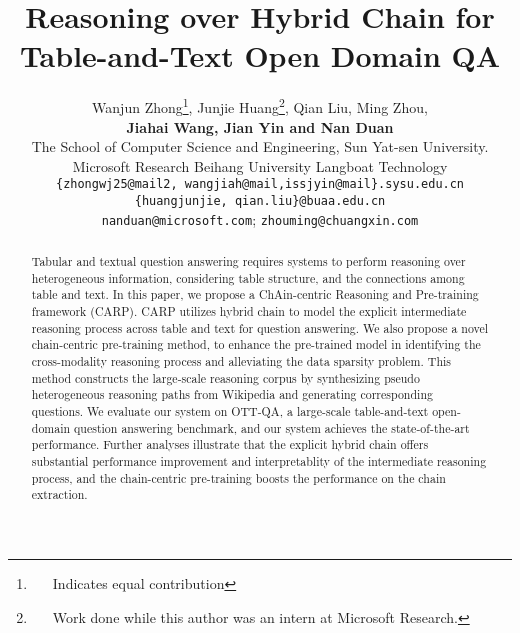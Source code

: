 \documentclass[11pt]{article}
\title{Reasoning over Hybrid Chain for Table-and-Text Open Domain QA}
\author{Wanjun Zhong\thanks{\ \ \ Indicates equal contribution}, Junjie Huang\thanks{\ \ \ Work done while this author was an intern at Microsoft Research.}, Qian Liu, Ming Zhou,\\ \textbf{Jiahai Wang, Jian Yin and Nan Duan} \\
	 The School of Computer Science and Engineering, Sun Yat-sen University.\\
	 Microsoft Research \quad  Beihang University \quad  Langboat Technology\\
	{\tt \{zhongwj25@mail2, wangjiah@mail,issjyin@mail\}.sysu.edu.cn}\\
	{\tt \{huangjunjie, qian.liu\}@buaa.edu.cn} \\
	{\tt nanduan@microsoft.com}; \tt zhouming@chuangxin.com\\ 
}
\begin{document}
	\maketitle
	\begin{abstract}
Tabular and textual question answering requires systems to perform reasoning over heterogeneous information, considering table structure, and the connections among table and text. In this paper, we propose a ChAin-centric Reasoning and Pre-training framework (CARP). CARP utilizes hybrid chain to model the explicit intermediate reasoning process across table and text for question answering. We also propose a novel chain-centric pre-training method, to enhance the pre-trained model in identifying the cross-modality reasoning process and alleviating the data sparsity problem. This method constructs the large-scale reasoning corpus by synthesizing pseudo heterogeneous reasoning paths from Wikipedia and generating corresponding questions. We evaluate our system on OTT-QA, a large-scale table-and-text open-domain question answering benchmark, and our system achieves the state-of-the-art performance. Further analyses illustrate that the explicit hybrid chain offers substantial performance improvement and interpretablity of the intermediate reasoning process, and the chain-centric pre-training boosts the performance on the chain extraction.


		
		
	\end{abstract}
	\iffalse
	\begin{abstract}
		Tabular and textual open-domain multi-hop question answering requires systems to retrieve knowledge from both tabular and textual corpus, and perform multi-hop reasoning to aggregate hybrid information to derive an answer.
		In this paper, we propose a ChAin-centric Reasoning and Pre-training approach (CARP) to model the explicit intermediate reasoning process for question answering.
CARP utilizes hybrid chain, the fine-grained reasoning path across two modalities, as the intermediate state for downstream question answering.
We also propose a chain-centric pre-training task to enhance the model in identifying the relevant chains, and a novel way to sythesize the large-scale pre-training corpus by reversely generating questions from the pseudo hybrid chains constructed from Wikipedia corpus containing both tables and passages.
We evaluate our system on OTT-QA, a large-scale tabular and textual open-domain question answering dataset, and our system achieves the state-of-the-art performance.
Further analyses illustrate that the explicit hybrid chain offers substantial performance improvement and interpretable explanation of the intermediate reasoning process, and the chain-centric pre-training boosts the performance on the hybrid chain extraction.~\footnote{We will release our code and data upon acceptance.}


		
	\end{abstract}
	\fi
	
\end{document}
